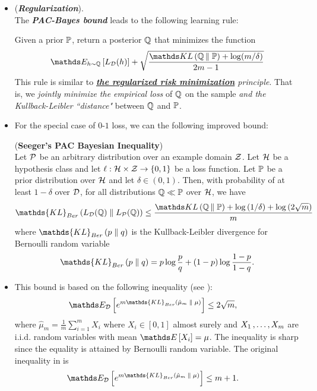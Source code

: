 \documentclass[11pt]{article}
\begin{document}
\begin{itemize}
\item \begin{remark} (\textbf{\emph{Regularization}}). \\
The \emph{\textbf{PAC-Bayes bound}} leads to the following learning rule:

Given a prior ${\mathbb P}$, return a posterior ${\mathbb Q}$ that minimizes the function
\begin{align}
 \E{h \sim \bQ}{L_{\cD}(h)} + \sqrt{\frac{ \kl{\bQ}{\bP}  + \log(m/\delta)}{2m-1}} \label{eqn: pac_bayes_learning}
\end{align}
This rule is similar to \emph{\textbf{\underline{the regularized risk minimization}} principle}. That is, we \emph{jointly minimize the empirical loss} of ${\mathbb Q}$ on the sample \emph{and the Kullback-Leibler ``distance"} between ${\mathbb Q}$ and ${\mathbb P}$.
\end{remark}


\item For the special case of $0$-$1$ loss, we can the following improved bound:
\begin{theorem}(\textbf{Seeger's PAC Bayesian Inequality})\citep{seeger2002pac, maurer2004note, rasmussen2006gaussian, alquier2021user}\\
Let ${\mathcal P}$ be an arbitrary distribution over an example domain ${\mathcal Z}$. Let ${\mathcal H}$ be a hypothesis class and let $\ell: {\mathcal H} \times {\mathcal Z} \to \left\{0,1\right\}$ be a loss function. Let ${\mathbb P}$ be a prior distribution over ${\mathcal H}$ and let $\delta \in (0,1)$. Then, with probability of at least $1 - \delta$ over ${\mathcal D}$, for all distributions ${\mathbb Q} \ll {\mathbb P}$ over ${\mathcal H}$, we have
\begin{align}
\mathds{KL}_{Ber}\paren{L_{\cD}(\bQ) \;\|\; L_{\cP}(\bQ)} \le   \frac{\kl{\bQ}{\bP} + \log\paren{1/\delta} + \log\paren{2\sqrt{m}}}{m} \label{ineqn: seeger_pac_bayes_kl}
\end{align} where $\mathds{KL}_{Ber}\paren{p \;\|\; q}$ is  the Kullback-Leibler divergence for Bernoulli random variable
\begin{align*}
\mathds{KL}_{Ber}\paren{p \;\|\; q} = p \log\frac{p}{q} + (1-p)\log\frac{1-p}{1- q}.
\end{align*}
\end{theorem}

\item \begin{remark}
This bound is based on the following inequality (see \citep{maurer2004note}):
\begin{align}
\E{\cD}{e^{m\mathds{KL}_{Ber}\paren{\hat{\mu}_m \;\|\; \mu} }} &\le 2\sqrt{m}, \label{pf: seeger_pac_bayes_kl_1}
\end{align} where $\hat{\mu}_m = \frac{1}{m}\sum_{i=1}^{m}X_i$ where $X_i \in  [0,1]$ almost surely and $X_1 \,{,}\ldots{,}\, X_m$ are i.i.d. random variables with mean $\E{}{X_i} = \mu$. The inequality is sharp since the equality is attained by Bernoulli random variable. The original inequality in \citep{seeger2002pac} is 
\begin{align*}
\E{\cD}{e^{m\mathds{KL}_{Ber}\paren{\hat{\mu}_m \;\|\; \mu} }} &\le m + 1.
\end{align*}
\end{remark}


\end{itemize}
\end{document}
